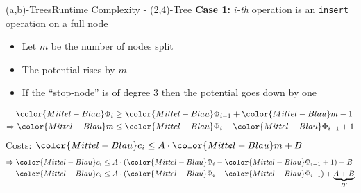 
\begin{frame}{(a,b)-Trees}{Runtime Complexity - (2,4)-Tree}
  \textbf{Case 1:}
  {\color{Mittel-Blau}$i$}-\textit{th} operation is an
  \texttt{\color{Mittel-Blau}insert} operation on a full node
  \begin{itemize}
    \item<2->
      Let {\color{Mittel-Blau}$m$} be the number of nodes split
    \item<3->
      The potential rises by {\color{Mittel-Blau}$m$}
    \item<4->
      If the \enquote{stop-node} is of {\color{Mittel-Blau}degree 3} then the
      potential goes down by one
  \end{itemize}
  \begin{align*}
    {\color{Mittel-Blau}\Phi_i}
      &\geq {\color{Mittel-Blau}\Phi_{i-1}} + {\color{Mittel-Blau}m} - 1\\
    \Rightarrow {\color{Mittel-Blau}m}
      &\leq {\color{Mittel-Blau}\Phi_i} - {\color{Mittel-Blau}\Phi_{i-1}} + 1
  \end{align*}
  Costs:
  \begin{math}
    {\color{Mittel-Blau}c_i} \leq A \cdot {\color{Mittel-Blau}m} + B
  \end{math}
  \begin{align*}
    \Rightarrow {\color{Mittel-Blau}c_i}
      &\leq A \cdot \left(
        {\color{Mittel-Blau}\Phi_i} - {\color{Mittel-Blau}\Phi_{i-1}} + 1
      \right) + B\\
    {\color{Mittel-Blau}c_i}
      &\leq A \cdot \left(
      {\color{Mittel-Blau}\Phi_i} - {\color{Mittel-Blau}\Phi_{i-1}}
      \right) + \underbrace{A + B}_{B'}\\
  \end{align*}
\end{frame}


